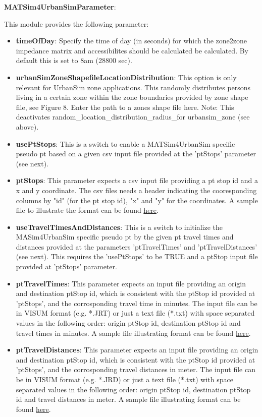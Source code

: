 \textbf{MATSim4UrbanSimParameter}:

This module provides the following parameter:
\begin{itemize}
	\item \textbf{timeOfDay}: Specify the time of day (in seconds)  for which the zone2zone impedance matrix and accessibilites should be  calculated be calculated. By default this is set to 8am (28800 sec).
	\item \textbf{urbanSimZoneShapefileLocationDistribution}: This  option is only relevant for UrbanSim zone applications. This randomly  distributes persons living in a certain zone within the zone boundaries  provided by zone shape file, see Figure 8. Enter the path to a zones  shape file here. Note: This deactivates random\_location\_distribution\_radius\_for urbansim\_zone (see above).
	\item \textbf{usePtStops}: This is a switch to enable a  MATSim4UrbanSim specific pseudo pt based on a given csv input file  provided at the 'ptStops' parameter (see next).
	\item \textbf{ptStops}: This parameter expects a csv input file  providing a pt stop id and a x and y coordinate. The csv files needs a  header indicating the cooresponding columns by "id" (for the pt stop  id), "x" and "y" for the coordinates. A sample file to illustrate the  format can be found \href{https://svn.vsp.tu-berlin.de/repos/public-svn/matsim/examples/countries/us/seattle/ptStops.csv}{here}.
	\item \textbf{useTravelTimesAndDistances}: This is a switch to  initialize the MASim4UrbanSim specific pseudo pt by the given pt travel  times and distances provided at the parameters 'ptTravelTimes' and  'ptTravelDistances' (see next). This requires the 'usePtStops' to be TRUE and a ptStop input file provided at 'ptStops' parameter.
	\item \textbf{ptTravelTimes}: This parameter expects an input  file providing an origin and destination ptStop id, which is consistent  with the ptStop id provided at 'ptStops', and the corrosponding travel  time in minutes. The input file can be in VISUM format (e.g. *.JRT) or  just a text file (*.txt) with space separated values in the following  order: origin ptStop id, destination ptStop id and travel times in  minutes. A sample file illustrating format can be found \href{https://svn.vsp.tu-berlin.de/repos/public-svn/matsim/examples/countries/us/seattle/sampleTravelTimes.jrt}{here}.
	\item \textbf{ptTravelDistances}: This parameter expects an input  file providing an origin and destination ptStop id, which is consistent  with the ptStop id provided at 'ptStops', and the corrosponding travel  distances in meter. The input file can be in VISUM format (e.g. *.JRD)  or just a text file (*.txt) with space separated values in the following  order: origin ptStop id, destination ptStop id and travel distances in  meter. A sample file illustrating format can be found \href{https://svn.vsp.tu-berlin.de/repos/public-svn/matsim/examples/countries/us/seattle/sampleTravelTimes.jrt}{here}.
\end{itemize}

